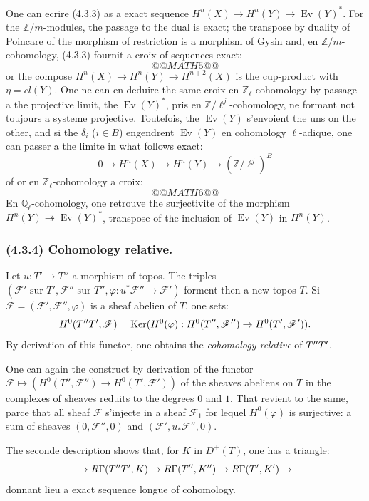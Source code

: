 \documentclass[12pt,a4paper]{article}
\theoremstyle{plain}
\theoremstyle{definition}
\theoremstyle{remark}
\DeclareMathOperator{\Ker}{Ker}
\DeclareMathOperator{\Ev}{Ev}
\let\mod\relax
\DeclareMathOperator{\mod}{mod}
\newcommand{\bbZ}{\mathbb{Z}}
\newcommand{\scrF}{\mathscr{F}}
\newcommand{\Zl}{\mathbb{Z}_\ell}
\newcommand{\Ql}{\mathbb{Q}_\ell}
\begin{document}
One can ecrire (4.3.3) as a exact sequence $H^n(X) \to H^n(Y) \to \Ev(Y)^*$. For the $\bbZ/m$-modules, the passage to the dual is exact; the transpose by duality of Poincare of the morphism of restriction is a morphism of Gysin and, en $\bbZ/m$-cohomology, (4.3.3) fournit a croix of sequences exact:
\[
@@MATH5@@
\tag{4.3.3.1}
\]
or the compose $H^n(X) \to H^n(Y) \to H^{n+2}(X)$ is the cup-product with $\eta = cl(Y)$. One ne can en deduire the same croix en $\Zl$-cohomology by passage a the projective limit, the $\Ev(Y)^*$, pris en $\bbZ/\ell^j$-cohomology, ne formant not toujours a systeme projective. Toutefois, the $\Ev(Y)$ s'envoient the uns on the other, and si the $\delta_i$ ($i \in B$) engendrent $\Ev(Y)$ en cohomology $\ell$-adique, one can passer a the limite in what follows exact:
\[
0 \to H^n(X) \to H^n(Y) \to (\bbZ/\ell^j)^B
\]
of or en $\Zl$-cohomology a croix:
\[
@@MATH6@@
\tag{4.3.3.2}
\]
En $\Ql$-cohomology, one retrouve the surjectivite of the morphism $H^n(Y) \twoheadrightarrow \Ev(Y)^*$, transpose of the inclusion of $\Ev(Y)$ in $H^n(Y)$.

\subsubsection*{\textup{(4.3.4)} Cohomology relative.}

Let $u : T' \to T''$ a morphism of topos. The triples $(\scrF' \text{ sur } T', \scrF'' \text{ sur } T'', \varphi : u^*\scrF'' \to \scrF')$ forment then a new topos $T$. Si $\scrF = (\scrF', \scrF'', \varphi)$ is a sheaf abelien of $T$, one sets:
\[
H^0(T'' \mod T', \scrF) = \Ker(H^0(\varphi) : H^0(T'', \scrF'') \to H^0(T', \scrF')).
\]
By derivation of this functor, one obtains the \emph{cohomology relative} of $T'' \mod T'$.

One can again the construct by derivation of the functor $\scrF \mapsto (H^0(T'', \scrF'') \to H^0(T', \scrF'))$ of the sheaves abeliens on $T$ in the complexes of sheaves reduits to the degrees $0$ and $1$. That revient to the same, parce that all sheaf $\scrF$ s'injecte in a sheaf $\scrF_1$ for lequel $H^0(\varphi)$ is surjective: a sum of sheaves $(0, \scrF'', 0)$ and $(\scrF', u_*\scrF'', 0)$.

The seconde description shows that, for $K$ in $D^+(T)$, one has a triangle:
\[
\to R\Gamma(T'' \mod T', K) \to R\Gamma(T'', K'') \to R\Gamma(T', K') \to
\]
donnant lieu a exact sequence longue of cohomology.
\end{document}
